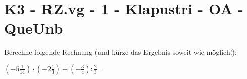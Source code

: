 \section{K3 - RZ.vg - 1 - Klapustri - OA - QueUnb}

\begin{beispiel}{0} %
				Berechne folgende Rechnung (und kürze das Ergebnis soweit wie möglich!):
				
				\begin{center}
				$(-5\frac{1}{14})\cdot(-2\frac{1}{3})+(-\frac{3}{4}):\frac{2}{3}=$
				\end{center}
				
\end{beispiel}